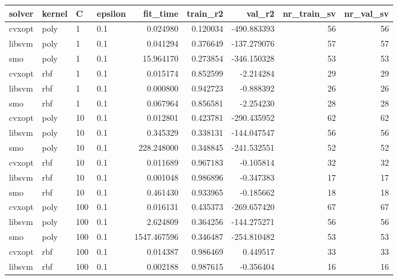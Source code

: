 \begin{tabular}{llllrrrrr}
\toprule
solver & kernel &   C & epsilon &    fit\_time &  train\_r2 &      val\_r2 &  nr\_train\_sv &  nr\_val\_sv \\
\midrule
cvxopt &   poly &   1 &     0.1 &    0.024980 &  0.120034 & -490.883393 &           56 &         56 \\
libsvm &   poly &   1 &     0.1 &    0.041294 &  0.376649 & -137.279076 &           57 &         57 \\
   smo &   poly &   1 &     0.1 &   15.964170 &  0.273854 & -346.150328 &           53 &         53 \\
cvxopt &    rbf &   1 &     0.1 &    0.015174 &  0.852599 &   -2.214284 &           29 &         29 \\
libsvm &    rbf &   1 &     0.1 &    0.000800 &  0.942723 &   -0.888392 &           26 &         26 \\
   smo &    rbf &   1 &     0.1 &    0.067964 &  0.856581 &   -2.254230 &           28 &         28 \\
cvxopt &   poly &  10 &     0.1 &    0.012801 &  0.423781 & -290.435952 &           62 &         62 \\
libsvm &   poly &  10 &     0.1 &    0.345329 &  0.338131 & -144.047547 &           56 &         56 \\
   smo &   poly &  10 &     0.1 &  228.248000 &  0.348845 & -241.532551 &           52 &         52 \\
cvxopt &    rbf &  10 &     0.1 &    0.011689 &  0.967183 &   -0.105814 &           32 &         32 \\
libsvm &    rbf &  10 &     0.1 &    0.001048 &  0.986896 &   -0.347383 &           17 &         17 \\
   smo &    rbf &  10 &     0.1 &    0.461430 &  0.933965 &   -0.185662 &           18 &         18 \\
cvxopt &   poly & 100 &     0.1 &    0.016131 &  0.435373 & -269.657420 &           67 &         67 \\
libsvm &   poly & 100 &     0.1 &    2.624809 &  0.364256 & -144.275271 &           56 &         56 \\
   smo &   poly & 100 &     0.1 & 1547.467596 &  0.346487 & -254.810482 &           53 &         53 \\
cvxopt &    rbf & 100 &     0.1 &    0.014387 &  0.986469 &    0.449517 &           33 &         33 \\
libsvm &    rbf & 100 &     0.1 &    0.002188 &  0.987615 &   -0.356404 &           16 &         16 \\

\end{tabular}
